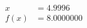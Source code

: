 \documentclass[preview]{standalone}
\begin{document}
\begin{align*}
x &= 4.9996\\f(x) &= 8.0000000
\end{align*}
\end{document}
